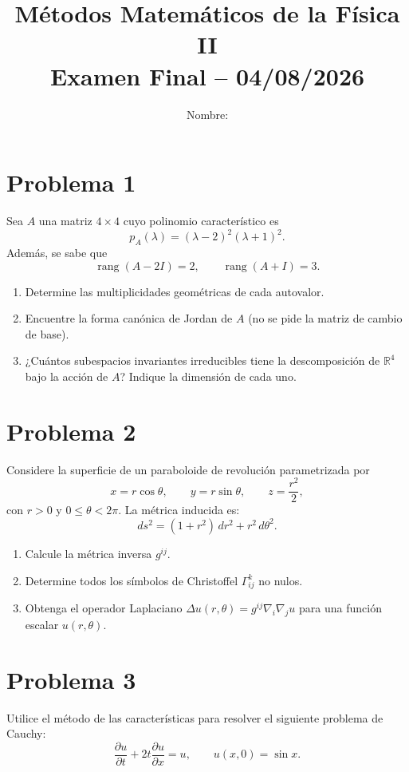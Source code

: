 \documentclass[12pt]{article}
\title{\textbf{Métodos Matemáticos de la Física II} \\ Examen Final – 04/08/2026}
\author{Nombre: \underline{\hspace{6cm}}}
\date{}
\begin{document}
\maketitle

\section*{Problema 1}
Sea \(A\) una matriz \(4 \times 4\) cuyo polinomio característico es
\[
p_A(\lambda) = (\lambda - 2)^2(\lambda + 1)^2.
\]
Además, se sabe que
\[
\operatorname{rang}(A - 2I) = 2, \qquad \operatorname{rang}(A + I) = 3.
\]
\begin{enumerate}
    \item[(a)] Determine las multiplicidades geométricas de cada autovalor.
    \item[(b)] Encuentre la forma canónica de Jordan de \(A\) (no se pide la matriz de cambio de base).
    \item[(c)] ¿Cuántos subespacios invariantes irreducibles tiene la descomposición de \(\mathbb{R}^4\) bajo la acción de \(A\)? Indique la dimensión de cada uno.
\end{enumerate}

\section*{Problema 2}
Considere la superficie de un paraboloide de revolución parametrizada por
\[
x = r \cos \theta, \qquad y = r \sin \theta, \qquad z = \frac{r^2}{2},
\]
con \(r > 0\) y \(0 \le \theta < 2\pi\). La métrica inducida es:
\[
ds^2 = (1 + r^2)\,dr^2 + r^2\,d\theta^2.
\]
\begin{enumerate}
    \item[(a)] Calcule la métrica inversa \(g^{ij}\).
    \item[(b)] Determine todos los símbolos de Christoffel \(\Gamma^k_{ij}\) no nulos.
    \item[(c)] Obtenga el operador Laplaciano \(\Delta u(r, \theta) = g^{ij}\nabla_i\nabla_j u\) para una función escalar \(u(r, \theta)\).
\end{enumerate}

\section*{Problema 3}
Utilice el método de las características para resolver el siguiente problema de Cauchy:
\[
\frac{\partial u}{\partial t} + 2t \frac{\partial u}{\partial x} = u, \qquad u(x, 0) = \sin x.
\]
\end{document}
